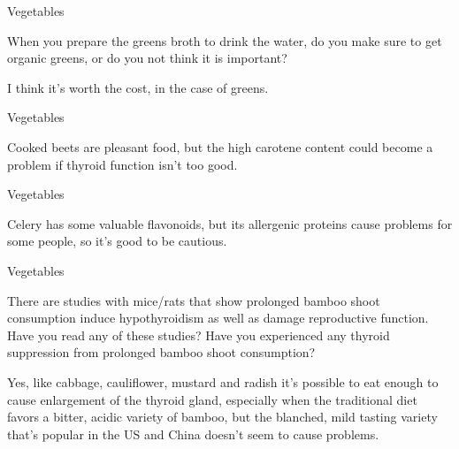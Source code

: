 \documentclass[11pt,oneside,openany,extrafontsizes]{memoir}
\begin{document}
\begin{qaexchange}{Vegetables}

    \begin{question}
        When you prepare the greens broth to drink the water, do you make sure to get organic greens, or do you not think it is important?
    \end{question}

    \begin{answer}
       I think it's worth the cost, in the case of greens. 
    \end{answer}
\end{qaexchange}

\begin{standalonequote}{Vegetables}

    \begin{answer}
       Cooked beets are pleasant food, but the high carotene content could become a problem if thyroid function isn't too good. 
    \end{answer}
\end{standalonequote}

\begin{standalonequote}{Vegetables}

    \begin{answer}
      Celery has some valuable flavonoids, but its allergenic proteins cause problems for some people, so it's good to be cautious.
    \end{answer}
\end{standalonequote}

\begin{qaexchange}{Vegetables}

    \begin{question}
        There are studies with mice/rats that show prolonged bamboo shoot consumption induce hypothyroidism as well as damage reproductive function. Have you read any of these studies? Have you experienced any thyroid suppression from prolonged bamboo shoot consumption?
    \end{question}

    \begin{answer}
       Yes, like cabbage, cauliflower, mustard and radish it's possible to eat enough to cause enlargement of the thyroid gland, especially when the traditional diet favors a bitter, acidic variety of bamboo, but the blanched, mild tasting variety that's popular in the US and China doesn't seem to cause problems.
    \end{answer}
\end{qaexchange}
\end{document}
